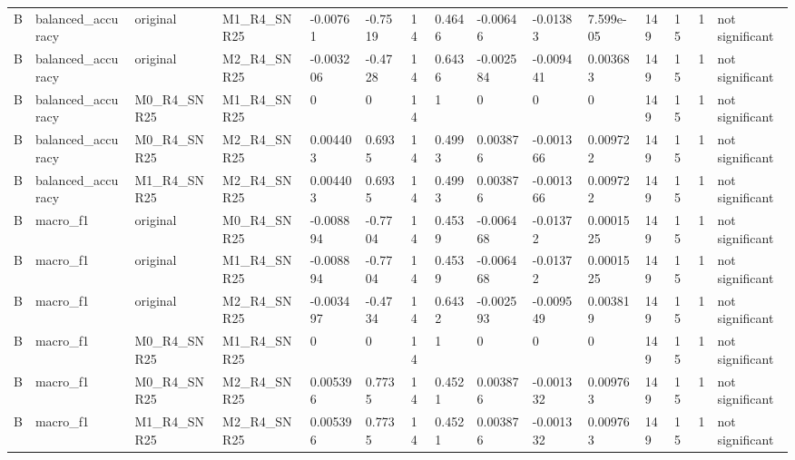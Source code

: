 \begin{tabular}{lllllllllllllll}
B & balanced\_accuracy & original & M1\_R4\_SNR25 & -0.00761 & -0.7519 & 14 & 0.4646 & -0.00646 & -0.01383 & 7.599e-05 & 149 & 15 & 1 & not significant \\
B & balanced\_accuracy & original & M2\_R4\_SNR25 & -0.003206 & -0.4728 & 14 & 0.6436 & -0.002584 & -0.009441 & 0.003683 & 149 & 15 & 1 & not significant \\
B & balanced\_accuracy & M0\_R4\_SNR25 & M1\_R4\_SNR25 & 0 & 0 & 14 & 1 & 0 & 0 & 0 & 149 & 15 & 1 & not significant \\
B & balanced\_accuracy & M0\_R4\_SNR25 & M2\_R4\_SNR25 & 0.004403 & 0.6935 & 14 & 0.4993 & 0.003876 & -0.001366 & 0.009722 & 149 & 15 & 1 & not significant \\
B & balanced\_accuracy & M1\_R4\_SNR25 & M2\_R4\_SNR25 & 0.004403 & 0.6935 & 14 & 0.4993 & 0.003876 & -0.001366 & 0.009722 & 149 & 15 & 1 & not significant \\
B & macro\_f1 & original & M0\_R4\_SNR25 & -0.008894 & -0.7704 & 14 & 0.4539 & -0.006468 & -0.01372 & 0.0001525 & 149 & 15 & 1 & not significant \\
B & macro\_f1 & original & M1\_R4\_SNR25 & -0.008894 & -0.7704 & 14 & 0.4539 & -0.006468 & -0.01372 & 0.0001525 & 149 & 15 & 1 & not significant \\
B & macro\_f1 & original & M2\_R4\_SNR25 & -0.003497 & -0.4734 & 14 & 0.6432 & -0.002593 & -0.009549 & 0.003819 & 149 & 15 & 1 & not significant \\
B & macro\_f1 & M0\_R4\_SNR25 & M1\_R4\_SNR25 & 0 & 0 & 14 & 1 & 0 & 0 & 0 & 149 & 15 & 1 & not significant \\
B & macro\_f1 & M0\_R4\_SNR25 & M2\_R4\_SNR25 & 0.005396 & 0.7735 & 14 & 0.4521 & 0.003876 & -0.001332 & 0.009763 & 149 & 15 & 1 & not significant \\
B & macro\_f1 & M1\_R4\_SNR25 & M2\_R4\_SNR25 & 0.005396 & 0.7735 & 14 & 0.4521 & 0.003876 & -0.001332 & 0.009763 & 149 & 15 & 1 & not significant \\
\hline
\end{tabular}

